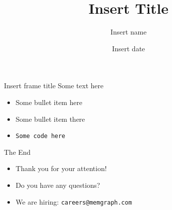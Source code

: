\documentclass{beamer}
\title[Insert Title]{Insert Title}
\author[Insert name]{Insert name}
\date{Insert date}
\begin{document}
 {
\begin{frame}
  \titlepage
\end{frame}
}

\begin{frame}{Insert frame title}
  Some text here

  \begin{itemize}
    \item Some bullet item here
    \item Some bullet item there
    \item \textcolor{mg-gray}{\texttt{Some code here}}
  \end{itemize}
\end{frame}

\begin{frame}{The End}
  \begin{itemize}
    \item Thank you for your attention!
      \pause
    \item Do you have any questions?
      \pause
    \item We are hiring: \textcolor{mg-gray}{\texttt{careers@memgraph.com}}
  \end{itemize}
\end{frame}
\end{document}
